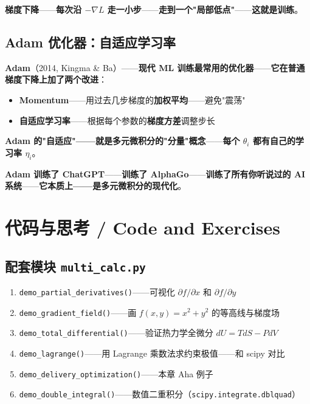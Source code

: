 \textbf{梯度下降}——\textbf{每次沿 $-\nabla L$ 走一小步}——\textbf{走到一个"局部低点"}——\textbf{这就是训练}。

\subsection{Adam 优化器：自适应学习率}

\textbf{Adam}（2014, Kingma \& Ba）——\textbf{现代 ML 训练最常用的优化器}——\textbf{它在普通梯度下降上加了两个改进}：

\begin{itemize}
\item \textbf{Momentum}——用过去几步梯度的\textbf{加权平均}——避免"震荡"
\item \textbf{自适应学习率}——根据每个参数的\textbf{梯度方差}调整步长
\end{itemize}

\textbf{Adam 的"自适应"——就是多元微积分的"分量"概念}——\textbf{每个 $\theta_i$ 都有自己的学习率 $\eta_i$}。

\textbf{Adam 训练了 ChatGPT}——\textbf{训练了 AlphaGo}——\textbf{训练了所有你听说过的 AI 系统}——\textbf{它本质上——是多元微积分的现代化}。

\section{代码与思考 / Code and Exercises}

\subsection{配套模块 \texttt{multi\_calc.py}}

\begin{enumerate}
\item \texttt{demo\_partial\_derivatives()}——可视化 $\partial f / \partial x$ 和 $\partial f / \partial y$
\item \texttt{demo\_gradient\_field()}——画 $f(x,y) = x^2 + y^2$ 的等高线与梯度场
\item \texttt{demo\_total\_differential()}——验证热力学全微分 $dU = TdS - PdV$
\item \texttt{demo\_lagrange()}——用 Lagrange 乘数法求约束极值——和 scipy 对比
\item \texttt{demo\_delivery\_optimization()}——本章 Aha 例子
\item \texttt{demo\_double\_integral()}——数值二重积分（\texttt{scipy.integrate.dblquad}）
\end{enumerate}

